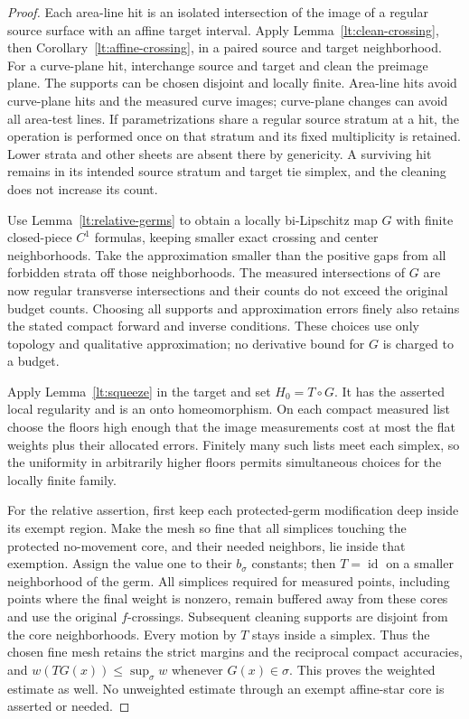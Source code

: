 \documentclass[11pt]{article}
\numberwithin{equation}{section}
\theoremstyle{definition}
\theoremstyle{remark}
\begin{document}
\begin{proof}
Each area-line hit is an isolated intersection of the image of a
regular source surface with an affine target interval.  Apply
Lemma~\ref{lt:clean-crossing}, then Corollary~\ref{lt:affine-crossing},
in a paired source and target neighborhood.  For a curve-plane hit,
interchange source and target and clean the preimage plane.  The
supports can be chosen disjoint and locally finite.  Area-line hits
avoid curve-plane hits and the measured curve images; curve-plane
changes can avoid all area-test lines.  If parametrizations share a
regular source stratum at a hit, the operation is performed once on
that stratum and its fixed multiplicity is retained.  Lower strata
and other sheets are absent there by genericity.  A surviving hit
remains in its intended source stratum and target tie simplex, and
the cleaning does not increase its count.

Use Lemma~\ref{lt:relative-germs} to obtain a locally bi-Lipschitz
map $G$ with finite closed-piece $C^1$ formulas, keeping smaller
exact crossing and center neighborhoods.  Take the approximation
smaller than the positive gaps from all forbidden strata off those
neighborhoods.  The measured intersections of $G$ are now regular
transverse intersections and their counts do not exceed the
original budget counts.  Choosing all supports and approximation
errors finely also retains the stated compact forward and inverse
conditions.  These choices use only topology and qualitative
approximation; no derivative bound for $G$ is charged to a budget.

Apply Lemma~\ref{lt:squeeze} in the target and set $H_0=T\circ G$.
It has the asserted local regularity and is an onto homeomorphism.
On each compact measured list choose the floors high enough that
the image measurements cost at most the flat weights plus their
allocated errors.  Finitely many such lists meet each simplex, so
the uniformity in arbitrarily higher floors permits simultaneous
choices for the locally finite family.

For the relative assertion, first keep each protected-germ modification
deep inside its exempt region.  Make the mesh so fine that all
simplices touching the protected no-movement core, and their needed
neighbors, lie inside that exemption.  Assign the value one to
their $b_\sigma$ constants; then $T=\operatorname{id}$ on a smaller neighborhood
of the germ.  All simplices required for measured points, including
points where the final weight is nonzero, remain buffered away
from these cores and use the original $f$-crossings.  Subsequent
cleaning supports are disjoint from the core neighborhoods.
Every motion by $T$ stays inside a simplex.  Thus the chosen fine
mesh retains the strict margins and the reciprocal compact
accuracies, and $w(TG(x))\leq\sup_\sigma w$ whenever $G(x)\in\sigma$.
This proves the weighted estimate as well.  No unweighted estimate
through an exempt affine-star core is asserted or needed.
\end{proof}
\end{document}
